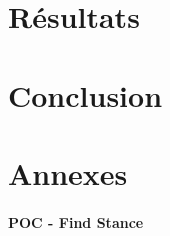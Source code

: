 \documentclass[a4paper,12pt]{article}
\begin{document}
\newpage
\part{Résultats}
	
	\newpage

\part{Conclusion}
	
	\newpage




\newpage
\part{Annexes}
	\subsection{POC - Find Stance}
	\label{annexe-stance-detection}	%
	
\end{document}
